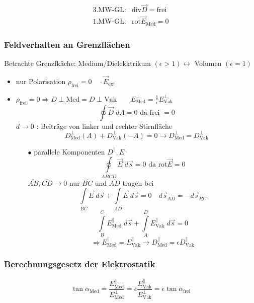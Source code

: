 \documentclass[titlepage,12pt,a4paper,ngerman]{report}
\newcommand{\tx}[1]{\textrm{#1}}
\newcommand{\ol}[1]{\overline{#1}}
\begin{document}
$$\boxed{\begin{array}{ll}
\tx{3.MW-GL}: & \tx{div}\vec{D} = \tx{frei} \\
\tx{1.MW-GL}: & \tx{rot}\vec{E}_{\tx{Med}} = 0
\end{array}
}$$
\subsubsection{Feldverhalten an Grenzflächen}
Betrachte Grenzfkäche: Medium/Dielekktrikum $(\epsilon>1) \leftrightarrow$ Volumen $(\epsilon=1)$
\begin{itemize}
\item nur Polarisation $\rho_{\tx{frei}} = 0 \quad \cdot \vec{E}_{\tx{ext}}$
\item $\rho_{\tx{frei}} = 0 \Rightarrow D \perp \tx{Med} = D \perp \tx{Vak} \qquad E_{\tx{Med}}^{\perp} = \frac{1}{\epsilon} E^{\perp}_{\tx{Vak}}$
$$\oint\vec{D}\; dA = 0 \tx{ da frei } = 0$$
$d\rightarrow0$ : Beiträge von linker und rechter Stirnfläche
$$D^{\perp}_{\tx{Med}} (A) + D^{\perp}_{\tx{Vak}}(-A) = 0 \rightarrow D^{\perp}_{\tx{Med}} = D^{\perp}_{\tx{Vak}}$$
\begin{itemize}
\item[$\bullet$] parallele Komponenten $D^{\parallel} , E^{\parallel}$
$$\oint\limits_{ABCD} \vec{E}\;d\vec{s} = 0 \tx{ da rot}\vec{E} = 0$$
$\ol{AB}, \ol{CD} \rightarrow 0$ nur $\ol{BC}$ und $\ol{AD}$ tragen bei
$$\int\limits_{\ol{BC}}\vec{E}\;d\vec{s} + \int\limits_{\ol{AD}} \vec{E} \;d\vec{s} = 0 \quad d\vec{s}_{\ol{AD}} = -d\vec{s}_{\ol{BC}}$$
$$\int\limits_B^C E^{\parallel}_{\tx{Med}} \;d\vec{s} + \int\limits_A^D E^{\parallel}_{\tx{Vak}}  \;d\vec{s} = 0$$
$$\Rightarrow  E^{\parallel}_{\tx{Med}} = E^{\parallel}_{\tx{Vak}}  \rightarrow D^{\parallel}_{\tx{Med}} = \epsilon D^{\parallel}_{\tx{Vak}}$$
\end{itemize}
\end{itemize}

\subsubsection{Berechnungsgesetz der Elektrostatik}
$$\tan \alpha_{\tx{Med}} = \frac{E^{\parallel}_{\tx{Med}}}{E^{\perp}_{\tx{Med}}} = \epsilon \frac{E^{\parallel}_{\tx{Vak}}}{E^{\perp}_{\tx{Vak}}} = \epsilon \tan \alpha_{\tx{frei}}$$
\end{document}
